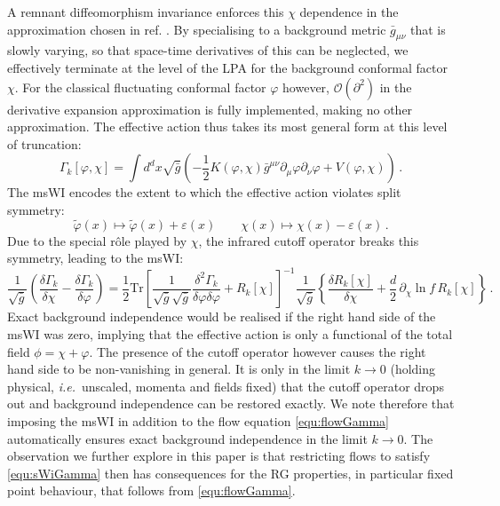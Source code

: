 \documentclass[11pt]{book} %
\newcommand\ie{\textit{i.e.}\ }
\newcommand{\eps}{\varepsilon}
\newcommand{\vp}{\varphi}
\newcommand{\dclnf}{\,\partial_\chi\! \ln\! f \,}
\newcommand{\be}{\begin{equation}}
\newcommand{\ee}{\end{equation}}
\begin{document}
A remnant diffeomorphism invariance enforces this $\chi$ dependence in the approximation chosen in ref. \cite{Dietz:2015owa}.
By specialising to a background metric ${\bar g}_{\mu\nu}$ that is slowly varying, so that space-time derivatives of this can be neglected, we
effectively terminate at the level of the LPA for the background conformal factor $\chi$. For the classical fluctuating conformal factor $\vp$ however,  $\mathcal{O}(\partial^2)$ in the derivative expansion approximation is fully implemented, making no other approximation.
The effective action thus takes its most general form at this level of truncation:
\begin{equation}
\label{trunc}
	\Gamma_k[\varphi, \chi] = \int d^dx \sqrt{\bar g} \left( -\frac{1}{2}K(\varphi,\chi)
	\bar g^{\mu\nu}\partial_{\mu}\varphi\partial_{\nu}\varphi + V(\varphi,\chi)  \right)\,.
\end{equation}
The msWI encodes the extent to which the effective action violates split symmetry:
\be
\label{equ:split-symmetry}
\tilde \vp(x) \mapsto \tilde \vp(x) + \eps(x) \qquad \chi(x) \mapsto \chi(x) -\eps(x)\,.
\ee
Due to the special r\^ole played by $\chi$, the infrared cutoff operator breaks this symmetry, leading to the msWI:
\be
\label{equ:sWiGamma}
\frac{1}{\sqrt{\bar g}}\left(\frac{\delta\Gamma_k}{\delta \chi}-\frac{\delta \Gamma_k}{\delta \vp}\right)
      =\frac{1}{2}\mathrm{Tr}\left[\frac{1}{\sqrt{\bar g}\sqrt{\bar g}}\frac{\delta^2\Gamma_k}
				  {\delta \vp \delta \vp}+ R_k[\chi]\right]^{-1} \frac{1}{\sqrt{\bar g}}
				  \left\{\frac{\delta R_k[\chi] }{\delta \chi}+\frac{d}{2}\dclnf R_k[\chi]\right\}\,.
\ee
Exact background independence would be realised if the right hand side of the msWI was zero, implying that the effective action is only a functional of the total field $\phi = \chi + \vp$. The presence of the cutoff operator however causes the right hand side to be non-vanishing in general. It is only in the limit $k\rightarrow0$ (holding physical, \ie unscaled, momenta and fields fixed) that the cutoff operator drops out and background independence can be restored exactly. We note therefore that imposing the msWI in addition to the flow equation \eqref{equ:flowGamma} automatically ensures exact background independence in the limit $k\rightarrow0$. The observation we further explore in this paper is that restricting flows to satisfy \eqref{equ:sWiGamma} then has consequences for the RG properties, in particular fixed point behaviour, that follows from \eqref{equ:flowGamma}.
\end{document}
